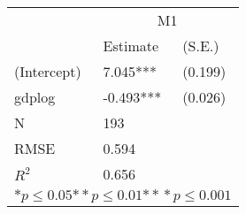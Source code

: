 \begin{tabular}{*{3}{l}}
\hline
                  & \multicolumn{2}{c}{M1}   \tabularnewline
                   &Estimate  &(S.E.)  \tabularnewline
 \hline
 \hline
   (Intercept)     &7.045***   &   (0.199) \tabularnewline
   gdplog          &-0.493***   &   (0.026) \tabularnewline
 \hline
 N                 &193       &        \tabularnewline
 RMSE             &0.594         & \tabularnewline
 $R^2$             &0.656         & \tabularnewline
 \hline
\hline
 
 \multicolumn{3}{c}{${*  p}\le 0.05$${*\!\!*  p}\le 0.01$${*\!\!*\!\!*  p}\le 0.001$}\tabularnewline
 \end{tabular}